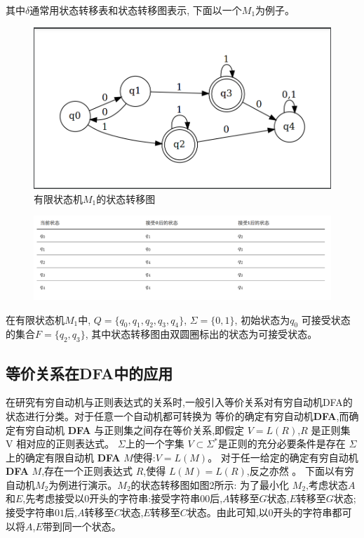 \documentclass{article}
\begin{document}
    其中$\delta$通常用状态转移表和状态转移图表示, 下面以一个$M_1$为例子。\\
    \begin{figure}[h]
        \centering
        \includegraphics[scale=0.2]{../Img/dfa_example.png}
        \caption{有限状态机$M_1$的状态转移图}
    \end{figure}

    \begin{figure}[h]
        \centering
        \includegraphics[scale=0.3]{../Img/minimized_pic.png}
    \end{figure}
    在有限状态机$M_1$中, $Q=\{q_0, q_1,q_2,q_3,q_4\}$, $\Sigma = \{0,1\}$, 初始状态为$q_0$
    可接受状态的集合$F = \{q_2, q_3\}$, 其中状态转移图由双圆圈标出的状态为可接受状态。


\subsection{等价关系在DFA中的应用}

在研究有穷自动机与正则表达式的关系时,一般引入等价关系对有穷自动机DFA的状态进行分类。对于任意一个自动机都可转换为
等价的确定有穷自动机\textbf{DFA},而确定有穷自动机 \textbf{DFA} 与正则集之间存在等价关系,即假定 $V=L(R)$,$R$ 是正则集 V 相对应的正则表达式。
$\Sigma$上的一个字集 $V \subset \Sigma^{*}$是正则的充分必要条件是存在 $\Sigma $上的确定有限自动机 \textbf{DFA} $M$使得:$V=L(M)$。 
对于任一给定的确定有穷自动机 \textbf{DFA} $M$,存在一个正则表达式 $R$,使得 $L(M)=L(R)$,反之亦然 。
下面以有穷自动机$M_2$为例进行演示。$M_2$的状态转移图如图2所示:
为了最小化 $M_2$,考虑状态$A$和$E$,先考虑接受以$0$开头的字符串:接受字符串$00$后,$A$转移至$G$状态,$E$转移至$G$状态;
接受字符串$01$后,$A$转移至$C$状态,$E$转移至$C$状态。由此可知,以$0$开头的字符串都可以将$A$,$E$带到同一个状态。
\end{document}
